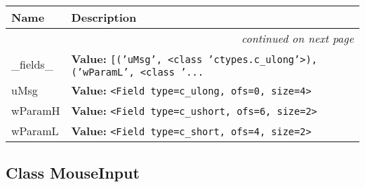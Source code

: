     \vspace{-1cm}
\hspace{\varindent}\begin{longtable}{|p{\varnamewidth}|p{\vardescrwidth}|l}
\cline{1-2}
\cline{1-2} \centering \textbf{Name} & \centering \textbf{Description}& \\
\cline{1-2}
\endhead\cline{1-2}\multicolumn{3}{r}{\small\textit{continued on next page}}\\\endfoot\cline{1-2}
\endlastfoot\raggedright \_\-f\-i\-e\-l\-d\-s\-\_\- & \raggedright \textbf{Value:} 
{\tt \texttt{[}\texttt{(}\texttt{'}\texttt{uMsg}\texttt{'}\texttt{, }{\textless}class 'ctypes.c\_ulong'{\textgreater}\texttt{)}\texttt{, }\texttt{(}\texttt{'}\texttt{wParamL}\texttt{'}\texttt{, }{\textless}class '\texttt{...}}&\\
\cline{1-2}
\raggedright u\-M\-s\-g\- & \raggedright \textbf{Value:} 
{\tt {\textless}Field type=c\_ulong, ofs=0, size=4{\textgreater}}&\\
\cline{1-2}
\raggedright w\-P\-a\-r\-a\-m\-H\- & \raggedright \textbf{Value:} 
{\tt {\textless}Field type=c\_ushort, ofs=6, size=2{\textgreater}}&\\
\cline{1-2}
\raggedright w\-P\-a\-r\-a\-m\-L\- & \raggedright \textbf{Value:} 
{\tt {\textless}Field type=c\_short, ofs=4, size=2{\textgreater}}&\\
\cline{1-2}
\end{longtable}



\subsection{Class MouseInput}

